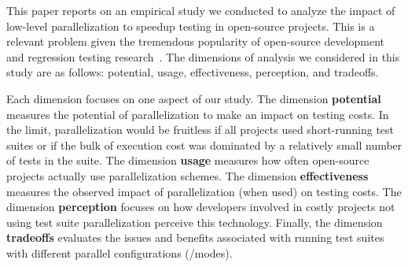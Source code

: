 
This paper reports on an empirical study we conducted to analyze the
impact of low-level parallelization to speedup testing in open-source
projects.  This is a relevant problem given the tremendous popularity
of open-source development and regression testing
research~\cite{yoo-harman-stvr2012}.  The dimensions of analysis we
considered in this study are as follows: potential, usage,
effectiveness, perception, and tradeoffs.


Each dimension focuses on one aspect of our study.  The dimension
\textbf{potential} measures the potential of parallelization to make
an impact on testing costs.  In the limit, parallelization would be
fruitless if all projects used short-running test suites or if the
bulk of execution cost was dominated by a relatively small number of
tests in the suite. The dimension \textbf{usage} measures how often
open-source projects actually use parallelization schemes.  The
dimension \textbf{effectiveness} measures the observed impact of
parallelization (when used) on testing costs. The dimension
\textbf{perception} focuses on how developers involved in costly
projects not using test suite parallelization perceive this
technology.  Finally, the dimension \textbf{tradeoffs} evaluates the
issues and benefits associated with running test suites with different
parallel configurations (/modes).



